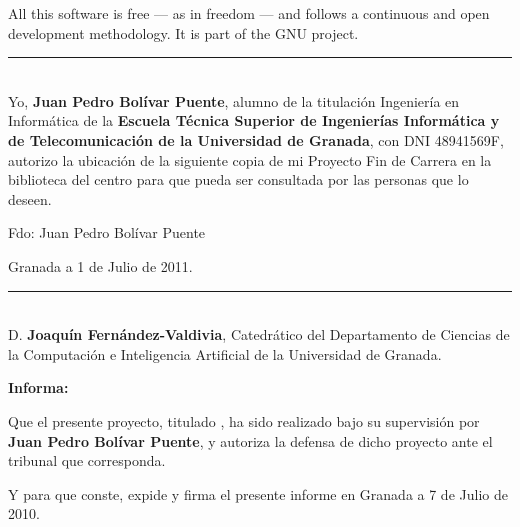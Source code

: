 All this software is free --- as in freedom --- and follows a
continuous and open development methodology. It is part of the GNU
project.


\cleardoublepage
\thispagestyle{empty}
\noindent\rule[-1ex]{\textwidth}{2pt}\\[4.5ex]

Yo, \textbf{Juan Pedro Bolívar Puente}, alumno de la titulación
Ingeniería en Informática de la \textbf{Escuela Técnica Superior de
  Ingenierías Informática y de Telecomunicación de la Universidad de
  Granada}, con DNI 48941569F, autorizo la ubicación de la siguiente
copia de mi Proyecto Fin de Carrera en la biblioteca del centro para
que pueda ser consultada por las personas que lo deseen.

\vspace{6cm}
\noindent Fdo: Juan Pedro Bolívar Puente

\vspace{2cm}

\begin{flushright}
Granada a 1 de Julio de 2011.
\end{flushright}



\clearpage
\thispagestyle{empty}
\noindent\rule[-1ex]{\textwidth}{2pt}\\[4.5ex]

D. \textbf{Joaquín Fernández-Valdivia}, Catedrático del Departamento
de Ciencias de la Computación e Inteligencia Artificial de la
Universidad de Granada.  \vspace{0.5cm}

\textbf{Informa:}
\vspace{0.5cm}

Que el presente proyecto, titulado \textit{\textbf{\myTitle}}, ha sido
realizado bajo su supervisión por \textbf{Juan Pedro Bolívar Puente},
y autoriza la defensa de dicho proyecto ante el tribunal que
corresponda.  \vspace{0.5cm}

Y para que conste, expide y firma el presente informe en Granada a 7
de Julio de 2010. 
\vspace{1cm}

